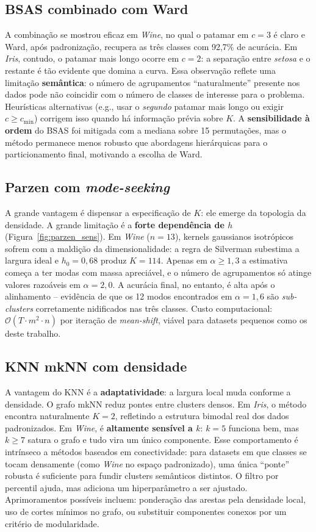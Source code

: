\documentclass[11pt,a4paper]{article}
\begin{document}
\subsection{BSAS combinado com Ward}
A combinação se mostrou eficaz em \emph{Wine}, no qual o patamar em $c=3$ é claro e Ward, após padronização, recupera as três classes com 92{,}7\% de acurácia. Em \emph{Iris}, contudo, o patamar mais longo ocorre em $c=2$: a separação entre \emph{setosa} e o restante é tão evidente que domina a curva.
Essa observação reflete uma limitação \textbf{semântica}: o número de agrupamentos ``naturalmente'' presente nos dados pode não coincidir com o número de classes de interesse para o problema. Heurísticas alternativas (e.g., usar o \emph{segundo} patamar mais longo ou exigir $c \geq c_{\min}$) corrigem isso quando há informação prévia sobre $K$.
A \textbf{sensibilidade à ordem} do BSAS foi mitigada com a mediana sobre 15 permutações, mas o método permanece menos robusto que abordagens hierárquicas para o particionamento final, motivando a escolha de Ward.

\subsection{Parzen com \emph{mode-seeking}}
A grande vantagem é dispensar a especificação de $K$: ele emerge da topologia da densidade.
A grande limitação é a \textbf{forte dependência de $h$} (Figura~\ref{fig:parzen_sens}). Em \emph{Wine} ($n=13$), kernels gaussianos isotrópicos sofrem com a maldição da dimensionalidade: a regra de Silverman subestima a largura ideal e $h_0 = 0{,}68$ produz $K=114$. Apenas em $\alpha \geq 1{,}3$ a estimativa começa a ter modas com massa apreciável, e o número de agrupamentos só atinge valores razoáveis em $\alpha = 2{,}0$. A acurácia final, no entanto, é alta após o alinhamento -- evidência de que os 12 modos encontrados em $\alpha = 1{,}6$ são \emph{sub-clusters} corretamente nidificados nas três classes.
Custo computacional: $\mathcal{O}(T \cdot m^2 \cdot n)$ por iteração de \emph{mean-shift}, viável para datasets pequenos como os deste trabalho.

\subsection{KNN mkNN com densidade}
A vantagem do KNN é a \textbf{adaptatividade}: a largura local muda conforme a densidade. O grafo mkNN reduz pontes entre clusters densos. Em \emph{Iris}, o método encontra naturalmente $K=2$, refletindo a estrutura bimodal real dos dados padronizados. Em \emph{Wine}, é \textbf{altamente sensível a $k$}: $k=5$ funciona bem, mas $k \geq 7$ satura o grafo e tudo vira um único componente.
Esse comportamento é intrínseco a métodos baseados em conectividade: para datasets em que classes se tocam densamente (como \emph{Wine} no espaço padronizado), uma única ``ponte'' robusta é suficiente para fundir clusters semânticos distintos. O filtro por percentil ajuda, mas adiciona um hiperparâmetro a ser ajustado. Aprimoramentos possíveis incluem: ponderação das arestas pela densidade local, uso de cortes mínimos no grafo, ou substituir componentes conexos por um critério de modularidade.
\end{document}
